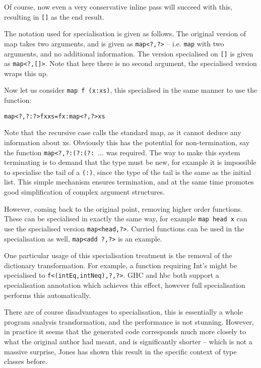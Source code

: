 \documentclass[preprint]{sigplanconf}
\newcommand{\T}[1]{\texttt{#1}}
\begin{document}
Of course, now even a very conservative inline pass will succeed with this,
resulting in \T{[]} as the end result.

The notation used for specialisation is given as follows. The original version
of map takes two arguments, and is given as \T{map<?,?>} -- i.e. \T{map} with
two arguments, and no additional information. The version specialised on \T{[]}
is given as \T{map<?,[]>}. Note that here there is no second argument, the
specialised version wraps this up.

Now let us consider \T{map f (x:xs)}, this specialised in the same manner to
use the function:

\begin{alltt}
 map<?,?:?> f x xs = f x : map<?,?> xs
\end{alltt}

Note that the recursive case calls the standard map, as it cannot deduce any
information about xs. Obviously this has the potential for non-termination, say
the function \T{map<?,?:(?:(?: $\ldots$} was required. The way to make this
system terminating is to demand that the type must be new, for example it is
impossible to specialise the tail of a \T{(:)}, since the type of the tail is
the same as the initial list. This simple mechanism ensures termination, and at
the same time promotes good simplification of complex argument structures.

However, coming back to the original point, removing higher order functions.
These can be specialised in exactly the same way, for example \T{map head x}
can use the specialised version \T{map<head,?>}. Curried functions can be used
in the specialisation as well, \T{map<add ?,?>} is an example.

One particular usage of this specialisation treatment is the removal of the
dictionary transformation. For example, a function requiring Int's might be
specialised to \T{f<(intEq,intNeq),?,?>}. GHC and hbc both support a
specialisation annotation which achieves this effect, however full
specialisation performs this automatically.

There are of course disadvantages to specialisation, this is essentially a
whole program analysis transformation, and the performance is not stunning.
However, in practice it seems that the generated code corresponds much more
closely to what the original author had meant, and is significantly shorter --
which is not a massive surprise, Jones has shown this result in the specific
context of type classes before.
\end{document}
